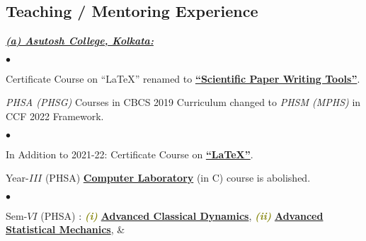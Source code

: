 \documentclass[margin,line]{res}
\newenvironment{list1}{
  \begin{list}{\ding{113}}{%
      \setlength{\itemsep}{0in}
      \setlength{\parsep}{0in} \setlength{\parskip}{0in}
      \setlength{\topsep}{0in} \setlength{\partopsep}{0in} 
      \setlength{\leftmargin}{0.17in}}}{\end{list}}
\newenvironment{list2}{
  \begin{list}{$\bullet$}{%
      \setlength{\itemsep}{0in}
      \setlength{\parsep}{0in} \setlength{\parskip}{0in}
      \setlength{\topsep}{0in} \setlength{\partopsep}{0in} 
      \setlength{\leftmargin}{0.2in}}}{\end{list}}
\begin{document}
\begin{resume}
\section{\sc Teaching / Mentoring Experience}
\begin{list1}
\item[] \textcolor{alizarin}{\underline{\textbf{\textit{(a) Asutosh College, Kolkata:}}}}
\vspace{1mm}
\end{list1}
\begin{list1}
\item[] \textcolor{iris}{}
\vspace{1mm}
\end{list1}
\begin{list2}
\item Certificate Course on ``\LaTeX'' renamed to \href{https://amitbny.github.io/akb.github.io/sem2H_LaTeX.html}{\bf ``Scientific Paper Writing Tools''}. 
\item {\it PHSA (PHSG)} Courses in CBCS 2019 Curriculum changed to {\it PHSM (MPHS)} in CCF 2022 Framework.  
\end{list2}
\begin{list1}
\item[] \textcolor{iris}{}
\vspace{1mm}
\end{list1}
\begin{list2}
\item In Addition to 2021-22: Certificate Course on \href{https://amitbny.github.io/akb.github.io/sem2H_LaTeX.html}{\bf ``\LaTeX''}. 
\item Year-$III$ (PHSA) \href{https://amitbny.github.io/akb.github.io/numerlabVIIIB.html}{\bf Computer Laboratory} (in C) course is abolished. 
\end{list2}
\begin{list1}
\item[] \textcolor{iris}{}
\vspace{1mm}
\end{list1}
\begin{list2}
\item Sem-$VI$ (PHSA) : \textcolor{olive}{\textit{\textbf{(i)}}} 
                        \href{https://amitbny.github.io/akb.github.io/sem6H_nld.html}{\bf Advanced Classical Dynamics}, 
                        \textcolor{olive}{\textit{\textbf{(ii)}}} 
                        \href{https://amitbny.github.io/akb.github.io/sem6H_neqsm.html}{\bf Advanced Statistical Mechanics}, \& 

\end{list2}
\end{resume}
\end{document}
